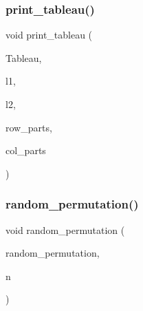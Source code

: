 \subsubsection{\texorpdfstring{print\+\_\+tableau()}{print\_tableau()}}
{\footnotesize\ttfamily void print\+\_\+tableau (\begin{DoxyParamCaption}\item[{\mbox{\hyperlink{galois_8h_a09fddde158a3a20bd2dcadb609de11dc}{I\+NT}} $\ast$}]{Tableau,  }\item[{\mbox{\hyperlink{galois_8h_a09fddde158a3a20bd2dcadb609de11dc}{I\+NT}}}]{l1,  }\item[{\mbox{\hyperlink{galois_8h_a09fddde158a3a20bd2dcadb609de11dc}{I\+NT}}}]{l2,  }\item[{\mbox{\hyperlink{galois_8h_a09fddde158a3a20bd2dcadb609de11dc}{I\+NT}} $\ast$}]{row\+\_\+parts,  }\item[{\mbox{\hyperlink{galois_8h_a09fddde158a3a20bd2dcadb609de11dc}{I\+NT}} $\ast$}]{col\+\_\+parts }\end{DoxyParamCaption})}

\mbox{\label{combinatorics_8_c_a783a99c64554c8e759d97d8c512217c9}} 
\subsubsection{\texorpdfstring{random\+\_\+permutation()}{random\_permutation()}}
{\footnotesize\ttfamily void random\+\_\+permutation (\begin{DoxyParamCaption}\item[{\mbox{\hyperlink{galois_8h_a09fddde158a3a20bd2dcadb609de11dc}{I\+NT}} $\ast$}]{random\+\_\+permutation,  }\item[{\mbox{\hyperlink{galois_8h_a09fddde158a3a20bd2dcadb609de11dc}{I\+NT}}}]{n }\end{DoxyParamCaption})}

\mbox{\label{combinatorics_8_c_a8ec9127fb82ee9dfa337c897c7060a57}} 
